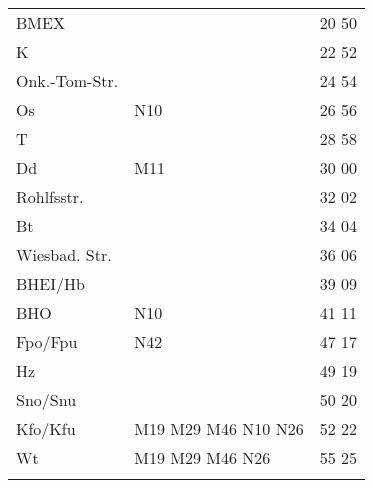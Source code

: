 \begin{tabular}{!{\color{schiefergrau}\vrule width 3pt}*{3}{l!{\color{schiefergrau}\vrule width 3pt}}}
\hline
{}
 \\
\hline
BMEX         &                                                                   & 20 50 \\
K            &                                                                   & 22 52 \\
Onk.-Tom-Str.&                                                                   & 24 54 \\
Os           & \nbus{} N10                                                       & 26 56 \\
T            &                                                                   & 28 58 \\
Dd           & \mbus{} M11                                                       & 30 00 \\
Rohlfsstr.   &                                                                   & 32 02 \\
Bt           &                                                                   & 34 04 \\
Wiesbad. Str.&                                                                   & 36 06 \\
BHEI/Hb      &                                                                   & 39 09 \\
BHO          & \nbus{} N10                                                       & 41 11 \\
Fpo/Fpu      & \nusieben{} \nbus{} N42                                           & 47 17 \\
Hz           &                                                                   & 49 19 \\
Sno/Snu      & \nuneun{}                                                         & 50 20 \\
Kfo/Kfu      & \nueins{} \nuzwei{} \nuneun{} \mbus{} M19 M29 M46 \nbus{} N10 N26 & 52 22 \\
Wt           & \nueins{} \nuzwei{} \mbus{} M19 M29 M46 \nbus{} N26               & 55 25 \\
\myhline
\end{tabular}
